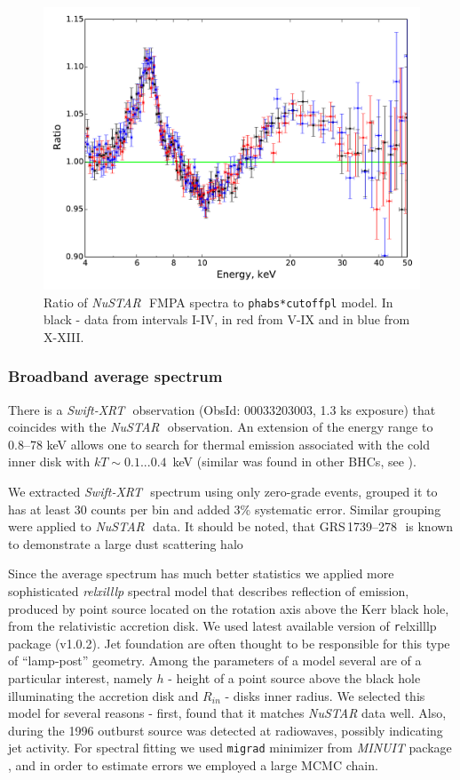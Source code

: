\documentclass[a4paper,fleqn,usenatbib]{mnras}
\def\grs{{GRS\,1739--278\,}}
\def\swiftx{{\em Swift-XRT\,}}
\def\nustar{{\em NuSTAR\,}}
\begin{document}
\begin{figure}
\centerline{\includegraphics[width=\linewidth]{ratios_v01.pdf}}
\caption{Ratio of \nustar\, FMPA spectra to \texttt{phabs*cutoffpl} model. In black - data from intervals I-IV, in red from V-IX and in blue from X-XIII.} 
\label{fig:ratios}
\end{figure}  

            
\subsubsection{Broadband average spectrum}
\label{sec:spec}            
There is a \swiftx\, observation (ObsId: 00033203003, 1.3 ks exposure) that coincides with the \nustar\, observation. 
An extension of the energy range to 0.8--78 keV allows one to search for thermal emission associated with the cold inner disk with $kT \sim 0.1...0.4$~keV (similar was found in other BHCs, see \cite[][ etc]{miller06b,miller06a,parker15}).

We extracted \swiftx\, spectrum using only zero-grade events, grouped it to has at least 30 counts per bin and added 3\% systematic error. 
Similar grouping were applied to \nustar\, data. It should be noted, that \grs\, is known to demonstrate a large dust scattering halo \citep{greiner96}

Since the average spectrum has much better statistics we applied more sophisticated {\it relxilllp} spectral model that describes reflection of emission, produced by point source located on the rotation axis above the Kerr black hole, from the relativistic accretion disk. 
We used latest available version of {\texttt relxilllp} package (v1.0.2).
Jet foundation are often thought to be responsible for this type of ``lamp-post'' geometry. 
Among the parameters of a model several are of a particular interest, namely $h$ - height of a point source above the black hole illuminating the accretion disk and $R_{in}$ - disks inner radius.  
We selected this model for several reasons - first, \cite{miller15_nust} found that it matches {\it NuSTAR} data well. 
Also, during the 1996 outburst source was detected at radiowaves, possibly indicating jet activity. 
For spectral fitting we used \texttt{migrad} minimizer from {\em MINUIT} package \citep{james75minuit}, and in order to estimate errors we employed a large MCMC chain. 
\end{document}
